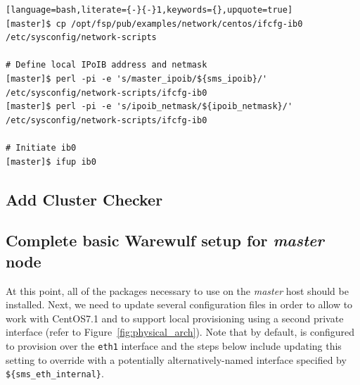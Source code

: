 \documentclass[letterpaper]{article}
\newcommand{\baseOS}{CentOS7.1}
\begin{document}
\begin{lstlisting}[language=bash,literate={-}{-}1,keywords={},upquote=true]
[master]$ cp /opt/fsp/pub/examples/network/centos/ifcfg-ib0 /etc/sysconfig/network-scripts

# Define local IPoIB address and netmask
[master]$ perl -pi -e 's/master_ipoib/${sms_ipoib}/' /etc/sysconfig/network-scripts/ifcfg-ib0
[master]$ perl -pi -e 's/ipoib_netmask/${ipoib_netmask}/' /etc/sysconfig/network-scripts/ifcfg-ib0

# Initiate ib0
[master]$ ifup ib0
\end{lstlisting}

\subsection{Add Cluster Checker} \label{sec:add_clck}


\subsection{Complete basic Warewulf setup for {\em master} node} \label{sec:setup_ww}

At this point, all of the packages necessary to use \Warewulf{} on the {\em
  master} host should be installed.  Next, we need to update several
configuration files in order to allow \Warewulf{} to work with \baseOS{} and to
support local provisioning using a second private interface (refer to
Figure~\ref{fig:physical_arch}). Note that by default, \Warewulf{} is configured to
provision over the \texttt{eth1} interface and the steps below include updating
this setting to override with a potentially alternatively-named interface specified by
\texttt{\$\{sms\_eth\_internal\}}.


\end{document}
